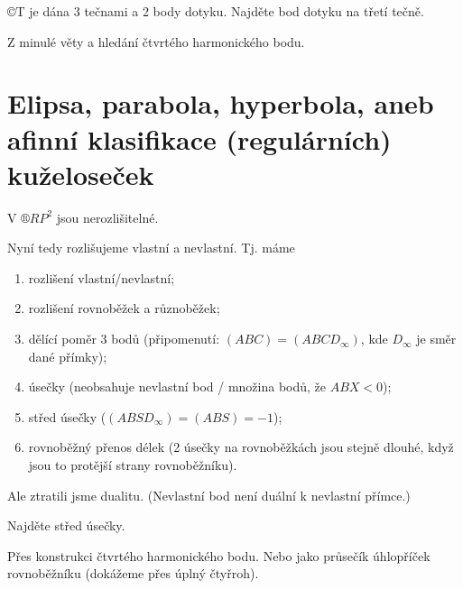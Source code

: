 \documentclass[12pt]{article}					%
\begin{document}
\begin{priklad}[Konstrukce]
	©T je dána 3 tečnami a 2 body dotyku. Najděte bod dotyku na třetí tečně.

	\begin{reseni}
		Z minulé věty a hledání čtvrtého harmonického bodu.
	\end{reseni}
\end{priklad}

\section{Elipsa, parabola, hyperbola, aneb afinní klasifikace (regulárních) kuželoseček}
\begin{poznamka}
	V $®R P^2$ jsou nerozlišitelné.
\end{poznamka}

\begin{poznamka}
	Nyní tedy rozlišujeme vlastní a nevlastní. Tj. máme
	\begin{enumerate}
		\item rozlišení vlastní/nevlastní;
		\item rozlišení rovnoběžek a různoběžek;
		\item dělící poměr 3 bodů (připomenutí: $(ABC) = (ABCD_∞)$, kde $D_∞$ je směr dané přímky);
		\item úsečky (neobsahuje nevlastní bod / množina bodů, že $ABX < 0$);
		\item střed úsečky ($(ABSD_∞) = (ABS) = -1$);
		\item rovnoběžný přenos délek (2 úsečky na rovnoběžkách jsou stejně dlouhé, když jsou to protější strany rovnoběžníku).
	\end{enumerate}
	Ale ztratili jsme dualitu. (Nevlastní bod není duální k nevlastní přímce.)
\end{poznamka}

\begin{priklad}[Konstrukce]
	Najděte střed úsečky.

	\begin{reseni}
		Přes konstrukci čtvrtého harmonického bodu. Nebo jako průsečík úhlopříček rovnoběžníku (dokážeme přes úplný čtyřroh).
	\end{reseni}
\end{priklad}
\end{document}
